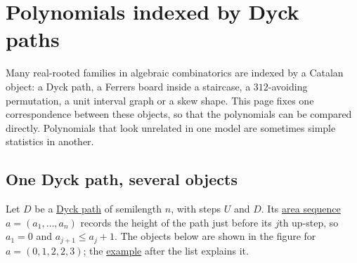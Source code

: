 


\section[dyckPathPolynomials]{Polynomials indexed by Dyck paths}

Many real-rooted families in algebraic combinatorics are indexed by a Catalan
object: a Dyck path, a Ferrers board inside a staircase, a $312$-avoiding
permutation, a unit interval graph or a skew shape.  This page fixes one
correspondence between these objects, so that the polynomials can be compared
directly.  Polynomials that look unrelated in one model are sometimes simple
statistics in another.


\subsection[dyckPathObjects]{One Dyck path, several objects}

Let $D$ be a \hyperref[qtCatalan]{Dyck path} of semilength $n$, with steps
$U$ and $D$.  Its \hyperref[areaSequence]{area sequence}
$a=(a_1,\dotsc,a_n)$ records the height of the path just before its $j$th
up-step, so $a_1=0$ and $a_{j+1}\leq a_j+1$.
The objects below are shown in the figure for $a=(0,1,2,2,3)$; the
\hyperref[dyckPathRunningExample]{example} after the list explains it.
\begin{figure}
\end{figure}

